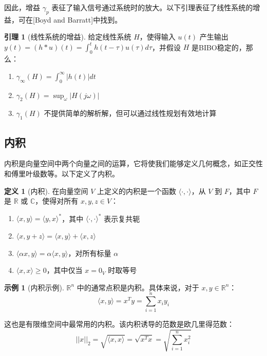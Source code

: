 \documentclass[UTF8,12pt,a4paper]{ctexart}
\theoremstyle{definition}
\newtheorem{definition}{定义}[section]
\newtheorem{lemma}{引理}[section]
\newtheorem{example}{示例}[section]
\begin{document}
因此，增益 $\gamma_p$ 表征了输入信号通过系统时的放大。以下引理表征了线性系统的增益，可在[Boyd and Barratt]中找到。

\begin{lemma}[线性系统的增益]
给定线性系统 $H$，使得输入 $u(t)$ 产生输出 $y(t)=(h*u)(t)=\int_0^t h(t-\tau)u(\tau)d\tau$，并假设 $H$ 是BIBO稳定的，那么：
\begin{enumerate}
\item $\gamma_\infty(H) = \int_0^\infty |h(t)| dt$
\item $\gamma_2(H) = \sup_{\omega} |H(j\omega)|$
\item $\gamma_1(H)$ 不提供简单的解析解，但可以通过线性规划有效地计算
\end{enumerate}
\end{lemma}

\subsection{内积}

内积是向量空间中两个向量之间的运算，它将使我们能够定义几何概念，如正交性和傅里叶级数等。以下定义了内积。

\begin{definition}[内积]
在向量空间 $V$ 上定义的内积是一个函数 $\langle \cdot, \cdot \rangle$，从 $V$ 到 $F$，其中 $F$ 是 $\mathbb{R}$ 或 $\mathbb{C}$，使得对所有 $x, y, z \in V$：
\begin{enumerate}
\item $\langle x, y \rangle = \langle y, x \rangle^*$，其中 $\langle \cdot, \cdot \rangle^*$ 表示复共轭
\item $\langle x, y+z \rangle = \langle x, y \rangle + \langle x, z \rangle$
\item $\langle \alpha x, y \rangle = \alpha \langle x, y \rangle$，对所有标量 $\alpha$
\item $\langle x, x \rangle \geq 0$，其中仅当 $x=0_V$ 时取等号
\end{enumerate}
\end{definition}

\begin{example}[内积示例]
$\mathbb{R}^n$ 中的通常点积是内积。具体来说，对于 $x, y \in \mathbb{R}^n$：
\[
\langle x, y \rangle = x^T y = \sum_{i=1}^{n} x_i y_i
\]

这也是有限维空间中最常用的内积。该内积诱导的范数是欧几里得范数：
\[
||x||_2 = \sqrt{\langle x, x \rangle} = \sqrt{x^T x} = \sqrt{\sum_{i=1}^{n} x_i^2}
\]
\end{example}
\end{document}

